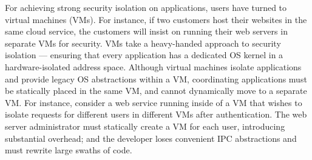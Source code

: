 For achieving strong security isolation on applications,
users have turned to virtual machines (VMs).
For instance, if two customers host their websites in the same cloud service,
the customers will insist on running their web servers in separate VMs for security.
VMs take a heavy-handed approach to security isolation --- ensuring 
that every application has a dedicated OS kernel in a hardware-isolated address space.
Although virtual machines isolate
applications and provide legacy OS abstractions within a VM, 
coordinating applications must be statically placed in the same VM,
and cannot dynamically move to a separate VM.
For instance, consider a web service running
inside of a VM that wishes to isolate requests for different users in
different VMs after authentication.  The web server administrator must
statically create a VM for each user, introducing substantial
overhead; and the developer loses convenient IPC abstractions and
must rewrite large swaths of code.
